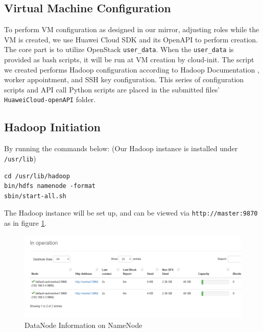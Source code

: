 \subsection{Virtual Machine Configuration}

To perform VM configuration as designed in our mirror, adjusting roles while the VM is created, we use Huawei Cloud SDK and its OpenAPI to perform creation. The core part is to utilize OpenStack \texttt{user\_data}. When the \texttt{user\_data} is provided as bash scripts, it will be run at VM creation by cloud-init. The script we created performs Hadoop configuration according to Hadoop Documentation \cite{Hadoop-setup}, worker appointment, and SSH key configuration. This series of configuration scripts and API call Python scripts are placed in the submitted files' \texttt{HuaweiCloud-openAPI} folder.

\subsection{Hadoop Initiation}

By running the commands below: (Our Hadoop instance is installed under \texttt{/usr/lib})

\begin{verbatim}
cd /usr/lib/hadoop
bin/hdfs namenode -format
sbin/start-all.sh   
\end{verbatim}

The Hadoop instance will be set up, and can be viewed via \texttt{http://master:9870} as in figure \ref{fig:DN-info}.

\begin{figure}[ht]
    \centering
    \includegraphics[width=\figurewidth]{figure/configured-hadoop.png}
    \caption{DataNode Information on NameNode}
    \label{fig:DN-info}
\end{figure}